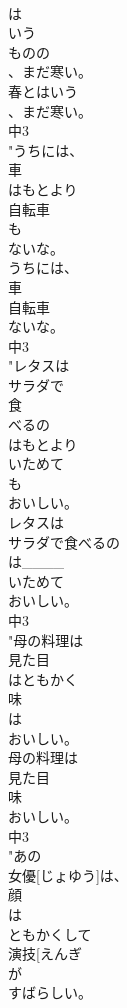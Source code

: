 \documentclass[8pt]{extreport}
\begin{document}
\begin{CJK}{UTF8}{min}
\\	は
\\	いう
\\	ものの
\\	、まだ寒い。
\\	春とはいう
\\	、まだ寒い。
\\	中3
\\	"うちには、
\\	車
\\	はもとより
\\	自転車
\\	も
\\	ないな。
\\	うちには、
\\	車
\\	自転車
\\	ないな。
\\	中3
\\	"レタスは
\\	サラダで
\\	食
\\	べるの
\\	はもとより
\\	いためて
\\	も
\\	おいしい。
\\	レタスは
\\	サラダで食べるの
\\	は____
\\	いためて
\\	おいしい。
\\	中3
\\	"母の料理は
\\	見た目
\\	はともかく
\\	味
\\	は
\\	おいしい。
\\	母の料理は
\\	見た目
\\	味
\\	おいしい。
\\	中3
\\	"あの
\\	女優[じょゆう]は、
\\	顔
\\	は
\\	ともかくして
\\	演技[えんぎ 
\\	が
\\	すばらしい。

\end{CJK}
\end{document}
